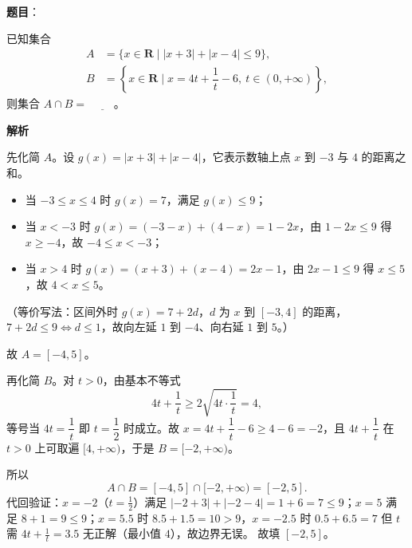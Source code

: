 \begin{answer}

\textbf{题目}：

已知集合
\nopagebreak[4]
\[
\begin{aligned}
A&=\{x\in\mathbf{R}\mid|x+3|+|x-4|\leqslant9\},\\
B&=\left\{x\in\mathbf{R}\mid x=4t+\dfrac1t-6,\ t\in(0,+\infty)\right\},
\end{aligned}
\]
则集合 $A\cap B=$ $\underline{\qquad}$。

\textbf{解析}

先化简 $A$。设 $g(x)=|x+3|+|x-4|$，它表示数轴上点 $x$ 到 $-3$ 与 $4$ 的距离之和。

\begin{itemize}
\item 当 $-3\leqslant x\leqslant4$ 时 $g(x)=7$，满足 $g(x)\leqslant9$；
\item 当 $x<-3$ 时 $g(x)=(-3-x)+(4-x)=1-2x$，由 $1-2x\leqslant9$ 得 $x\geqslant-4$，故 $-4\leqslant x<-3$；
\item 当 $x>4$ 时 $g(x)=(x+3)+(x-4)=2x-1$，由 $2x-1\leqslant9$ 得 $x\leqslant5$，故 $4<x\leqslant5$。
\end{itemize}

（等价写法：区间外时 $g(x)=7+2d$，$d$ 为 $x$ 到 $[-3,4]$ 的距离，$7+2d\leqslant9\iff d\leqslant1$，故向左延 $1$ 到 $-4$、向右延 $1$ 到 $5$。）

故 $A=[-4,5]$。

再化简 $B$。对 $t>0$，由基本不等式
\nopagebreak[4]
\[4t+\frac1t\geqslant2\sqrt{4t\cdot\frac1t}=4,\]
等号当 $4t=\dfrac1t$ 即 $t=\dfrac12$ 时成立。故 $x=4t+\dfrac1t-6\geqslant4-6=-2$，且 $4t+\dfrac1t$ 在 $t>0$ 上可取遍 $[4,+\infty)$，于是 $B=[-2,+\infty)$。

所以
\nopagebreak[4]
\[A\cap B=[-4,5]\cap[-2,+\infty)=[-2,5].\]
代回验证：$x=-2$（$t=\frac12$）满足 $|-2+3|+|-2-4|=1+6=7\leqslant9$；$x=5$ 满足 $8+1=9\leqslant9$；$x=5.5$ 时 $8.5+1.5=10>9$，$x=-2.5$ 时 $0.5+6.5=7$ 但 $t$ 需 $4t+\frac1t=3.5$ 无正解（最小值 $4$），故边界无误。
故填 $[-2,5]$。


\end{answer}
